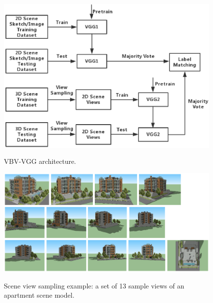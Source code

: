 \documentclass[times, 10pt,twocolumn]{article}
\begin{document}
\begin{figure}[htb]
\centering
{
\includegraphics[width=1.0\linewidth]{architecture}
}
\caption{VBV-VGG architecture.}
\label{architecture}
\end{figure}


\begin{figure}[htb]
\centering
{
\includegraphics[width=1.0\linewidth]{Sampleviewsexample}
}
\caption{Scene view sampling example: a set of 13 sample views of an apartment scene model.}
\label{Sampleviewsexample}
\end{figure}

\end{document}
